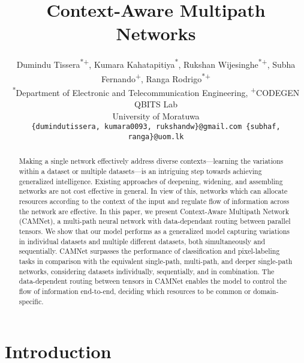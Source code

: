 \documentclass[10pt,twocolumn,letterpaper]{article}
\begin{document}
\title{Context-Aware Multipath Networks}

\author{Dumindu Tissera\textsuperscript{*+}, Kumara Kahatapitiya\textsuperscript{*}, Rukshan Wijesinghe\textsuperscript{*+}, Subha Fernando\textsuperscript{+}, Ranga Rodrigo\textsuperscript{*+}\\
\textsuperscript{*}Department of Electronic and Telecommunication Engineering, \textsuperscript{+}CODEGEN QBITS Lab\\
University of Moratuwa\\
\vspace{-0.2in}
{\tt\small \{dumindutissera, kumara0093, rukshandw\}@gmail.com  \{subhaf, ranga\}@uom.lk}}


\maketitle
\ifwacvfinal\thispagestyle{empty}\fi


\begin{abstract}
\vspace{-0.1in}
   Making a single network effectively address diverse contexts---learning the variations within a dataset or multiple datasets---is an intriguing step towards achieving generalized intelligence. Existing approaches of deepening,  widening,  and assembling networks are not cost effective in general. In view of this, networks which can allocate resources according to the context of the input and regulate flow of information across the network are effective. In this paper, we present Context-Aware Multipath Network (CAMNet), a multi-path neural network with data-dependant routing between parallel tensors. We show that our model performs as a generalized model capturing variations in individual datasets and multiple different datasets, both simultaneously and sequentially. CAMNet surpasses the  performance of classification and pixel-labeling tasks in comparison with the  equivalent single-path, multi-path, and deeper single-path networks, considering datasets individually, sequentially, and in combination. The data-dependent routing between tensors in CAMNet enables the model to control the flow of information end-to-end, deciding which resources to be common or domain-specific.
\vspace{-0.1in}
\end{abstract}

\section{Introduction}
\label{se:intro}
\vspace{-0.05in}
\end{document}
